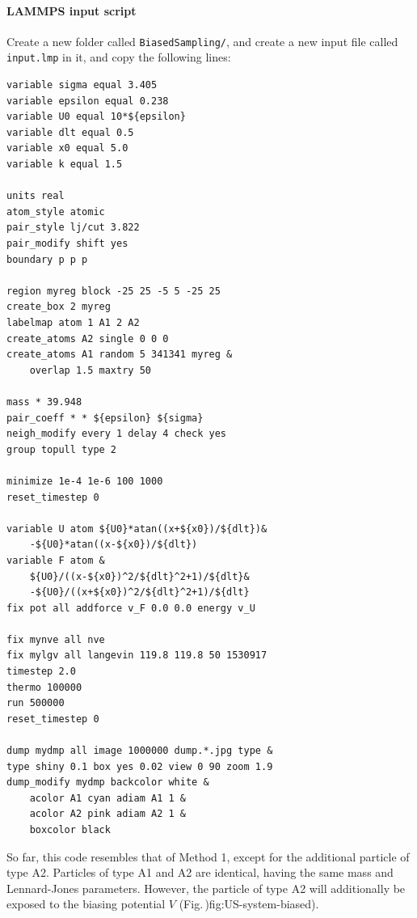 \documentclass[9pt,tutorial]{livecoms}
\newcommand{\flrcmd}[1]{\textcolor{command}{\texttt{#1}}} %
\newcommand{\flecmd}[1]{\textcolor{command}{\texttt{#1}}} %
\begin{document}
\paragraph{LAMMPS input script}
Create a new folder called \flrcmd{BiasedSampling/}, and create a new input file
called \flecmd{input.lmp} in it, and copy the following lines:
\begin{lstlisting}
variable sigma equal 3.405
variable epsilon equal 0.238
variable U0 equal 10*${epsilon}
variable dlt equal 0.5
variable x0 equal 5.0
variable k equal 1.5

units real
atom_style atomic
pair_style lj/cut 3.822
pair_modify shift yes
boundary p p p

region myreg block -25 25 -5 5 -25 25
create_box 2 myreg
labelmap atom 1 A1 2 A2
create_atoms A2 single 0 0 0
create_atoms A1 random 5 341341 myreg &
    overlap 1.5 maxtry 50

mass * 39.948
pair_coeff * * ${epsilon} ${sigma}
neigh_modify every 1 delay 4 check yes
group topull type 2

minimize 1e-4 1e-6 100 1000
reset_timestep 0

variable U atom ${U0}*atan((x+${x0})/${dlt})&
    -${U0}*atan((x-${x0})/${dlt})
variable F atom &
    ${U0}/((x-${x0})^2/${dlt}^2+1)/${dlt}&
    -${U0}/((x+${x0})^2/${dlt}^2+1)/${dlt}
fix pot all addforce v_F 0.0 0.0 energy v_U

fix mynve all nve
fix mylgv all langevin 119.8 119.8 50 1530917
timestep 2.0
thermo 100000
run 500000
reset_timestep 0

dump mydmp all image 1000000 dump.*.jpg type &
type shiny 0.1 box yes 0.02 view 0 90 zoom 1.9
dump_modify mydmp backcolor white &
    acolor A1 cyan adiam A1 1 &
    acolor A2 pink adiam A2 1 &
    boxcolor black
\end{lstlisting}
So far, this code resembles that of Method 1, except for the additional particle
of type A2. Particles of type A1 and A2
are identical, having the same mass and Lennard-Jones parameters. However, the
particle of type A2 will additionally be exposed to the biasing potential
$V$ (Fig.\,){fig:US-system-biased}).
\end{document}
